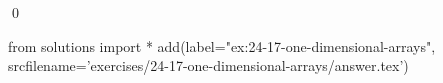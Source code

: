 
\begin{ex}
  \label{ex:24-17-one-dimensional-arrays}
  
  \qed
\end{ex}
\begin{python0}
from solutions import *
add(label="ex:24-17-one-dimensional-arrays",
    srcfilename='exercises/24-17-one-dimensional-arrays/answer.tex')
\end{python0}
